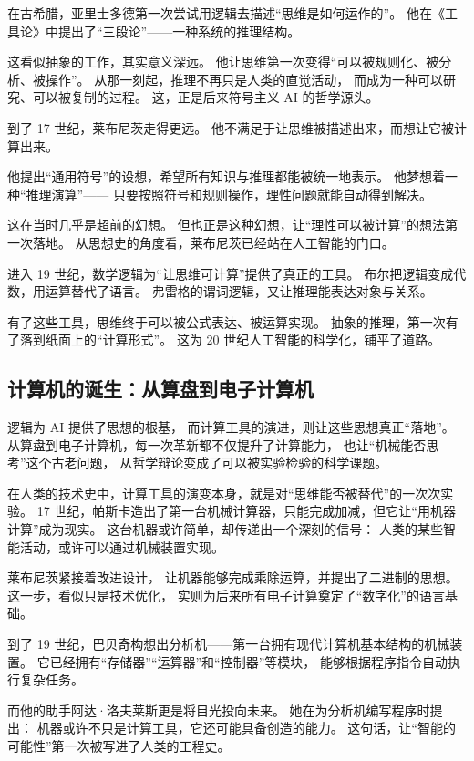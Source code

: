 在古希腊，亚里士多德第一次尝试用逻辑去描述“思维是如何运作的”。
他在《工具论》中提出了“三段论”——一种系统的推理结构。

这看似抽象的工作，其实意义深远。
他让思维第一次变得“可以被规则化、被分析、被操作”。
从那一刻起，推理不再只是人类的直觉活动，
而成为一种可以研究、可以被复制的过程。
这，正是后来符号主义 AI 的哲学源头。

到了 17 世纪，莱布尼茨走得更远。
他不满足于让思维被描述出来，而想让它被计算出来。

他提出“通用符号”的设想，希望所有知识与推理都能被统一地表示。
他梦想着一种“推理演算”——
只要按照符号和规则操作，理性问题就能自动得到解决。

这在当时几乎是超前的幻想。
但也正是这种幻想，让“理性可以被计算”的想法第一次落地。
从思想史的角度看，莱布尼茨已经站在人工智能的门口。

进入 19 世纪，数学逻辑为“让思维可计算”提供了真正的工具。
布尔把逻辑变成代数，用运算替代了语言。
弗雷格的谓词逻辑，又让推理能表达对象与关系。

有了这些工具，思维终于可以被公式表达、被运算实现。
抽象的推理，第一次有了落到纸面上的“计算形式”。
这为 20 世纪人工智能的科学化，铺平了道路。

\subsection{计算机的诞生：从算盘到电子计算机}

逻辑为 AI 提供了思想的根基，
而计算工具的演进，则让这些思想真正“落地”。
从算盘到电子计算机，每一次革新都不仅提升了计算能力，
也让“机械能否思考”这个古老问题，
从哲学辩论变成了可以被实验检验的科学课题。


在人类的技术史中，计算工具的演变本身，就是对“思维能否被替代”的一次次实验。
17 世纪，帕斯卡造出了第一台机械计算器，只能完成加减，但它让“用机器计算”成为现实。
这台机器或许简单，却传递出一个深刻的信号：
人类的某些智能活动，或许可以通过机械装置实现。

莱布尼茨紧接着改进设计，
让机器能够完成乘除运算，并提出了二进制的思想。
这一步，看似只是技术优化，
实则为后来所有电子计算奠定了“数字化”的语言基础。

到了 19 世纪，巴贝奇构想出分析机——第一台拥有现代计算机基本结构的机械装置。
它已经拥有“存储器”“运算器”和“控制器”等模块，
能够根据程序指令自动执行复杂任务。

而他的助手阿达·洛夫莱斯更是将目光投向未来。
她在为分析机编写程序时提出：
机器或许不只是计算工具，它还可能具备创造的能力。
这句话，让“智能的可能性”第一次被写进了人类的工程史。

